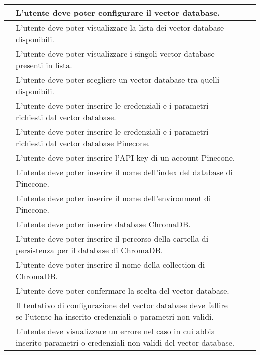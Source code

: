 \documentclass[10pt, a4paper]{article}
\begin{document}
\begin{xltabular}{\textwidth}{|c|X|c|c}
\hline {} & L'utente deve poter configurare il vector database. & \\
\hline {} & L'utente deve poter visualizzare la lista dei vector database disponibili. &  \\
\hline {} & L'utente deve poter visualizzare i singoli vector database presenti in lista. &  \\
\hline {} & L'utente deve poter scegliere un vector database tra quelli disponibili. &  \\
\hline {} & L'utente deve poter inserire le credenziali e i parametri richiesti dal vector database. &  \\
\hline {} & L'utente deve poter inserire le credenziali e i parametri richiesti dal vector database Pinecone. &  \\
\hline {} & L'utente deve poter inserire l'API key di un account Pinecone. &  \\
\hline {} & L'utente deve poter inserire il nome dell'index del database di Pinecone. &  \\
\hline {} & L'utente deve poter inserire il nome dell'environment di Pinecone. &  \\
\hline {} & L'utente deve poter inserire database ChromaDB. &  \\
\hline {} & L'utente deve poter inserire il percorso della cartella di persistenza per il database di ChromaDB. &  \\
\hline {} & L'utente deve poter inserire il nome della collection di ChromaDB. &  \\
\hline {} & L'utente deve poter confermare la scelta del vector database. &  \\
\hline {} & Il tentativo di configurazione del vector database deve fallire se l'utente ha inserito credenziali o parametri non validi. &  \\
\hline {} & L'utente deve visualizzare un errore nel caso in cui abbia inserito parametri o credenziali non validi del vector database. &  \\


\end{xltabular}
\end{document}
